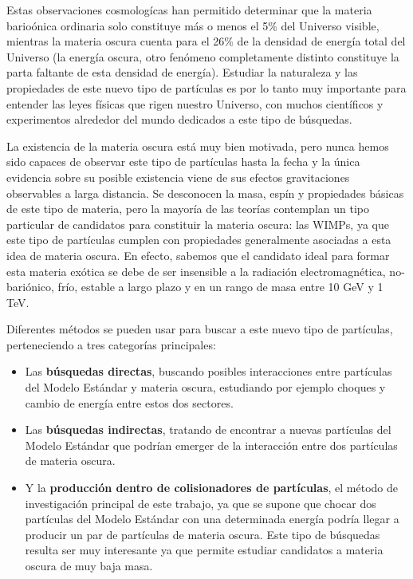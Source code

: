 \documentclass[a4paper, 10pt, openright]{report}
\begin{document}
\begin{appendices}
Estas observaciones cosmolog\'{i}cas han permitido determinar que la materia bario\'{o}nica ordinaria solo constituye m\'{a}s o menos el 5\% del Universo visible, mientras la materia oscura cuenta para el 26\% de la densidad de energ\'{i}a total del Universo (la energ\'{i}a oscura, otro fen\'{o}meno completamente distinto constituye la parta faltante de esta densidad de energ\'{i}a). Estudiar la naturaleza y las propiedades de este nuevo tipo de part\'{i}culas es por lo tanto muy importante para entender las leyes f\'{i}sicas que rigen nuestro Universo, con muchos cient\'{i}ficos y experimentos alrededor del mundo dedicados a este tipo de b\'{u}squedas.

La existencia de la materia oscura est\'{a} muy bien motivada, pero nunca hemos sido capaces de observar este tipo de part\'{i}culas hasta la fecha y la \'{u}nica evidencia sobre su posible existencia viene de sus efectos gravitaciones observables a larga distancia. Se desconocen la masa, esp\'{i}n y propiedades b\'{a}sicas de este tipo de materia, pero la mayor\'{i}a de las teor\'{i}as contemplan un tipo particular de candidatos para constituir la materia oscura: las \acp{WIMP}, ya que este tipo de part\'{i}culas cumplen con propiedades generalmente asociadas a esta idea de materia oscura. En efecto, sabemos que el candidato ideal para formar esta materia ex\'{o}tica se debe de ser insensible a la radiaci\'{o}n electromagn\'{e}tica, no-bari\'{o}nico, fr\'{i}o, estable a largo plazo y en un rango de masa entre 10 GeV y 1 TeV.

Diferentes m\'{e}todos se pueden usar para buscar a este nuevo tipo de part\'{i}culas, perteneciendo a tres categor\'{i}as principales:
\begin{itemize}
\item Las \textbf{b\'{u}squedas directas}, buscando posibles interacciones entre part\'{i}culas del Modelo Est\'{a}ndar y materia oscura, estudiando por ejemplo choques y cambio de energ\'{i}a entre estos dos sectores.
\item Las \textbf{b\'{u}squedas indirectas}, tratando de encontrar a nuevas part\'{i}culas del Modelo Est\'{a}ndar que podr\'{i}an emerger de la interacci\'{o}n entre dos part\'{i}culas de materia oscura.
\item Y la \textbf{producci\'{o}n dentro de colisionadores de part\'{i}culas}, el m\'{e}todo de investigaci\'{o}n principal de este trabajo, ya que se supone que chocar dos part\'{i}culas del Modelo Est\'{a}ndar con una determinada energ\'{i}a podr\'{i}a llegar a producir un par de part\'{i}culas de materia oscura. Este tipo de b\'{u}squedas resulta ser muy interesante ya que permite estudiar candidatos a materia oscura de muy baja masa.
\end{itemize}


\end{appendices}
\end{document}
